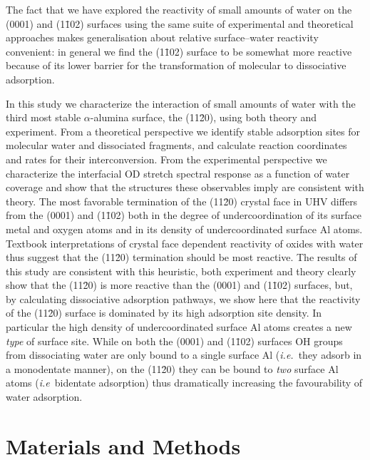 \documentclass[twoside,twocolumn,9pt]{article}
\begin{document}
The fact that we have explored the reactivity of small amounts of water on the (0001) and (1\=102) surfaces using the same suite of experimental and theoretical approaches makes generalisation about relative surface--water reactivity convenient: in general we find the (1\=102) surface to be somewhat more reactive because of its lower barrier for the transformation of molecular to dissociative adsorption.

In this study we characterize the interaction of small amounts of water with the third most stable $\alpha$-alumina surface, the (11\=20), using both theory and experiment. From a theoretical perspective we identify stable adsorption sites for molecular water and dissociated fragments, and calculate reaction coordinates and rates for their interconversion. From the experimental perspective we characterize the interfacial OD stretch spectral response as a function of water coverage and show that the structures these observables imply are consistent with theory. The most favorable termination of the (11\=20) crystal face in UHV differs from the (0001) and (1\=102) both in the degree of undercoordination of its surface metal and oxygen atoms and in its density of undercoordinated surface Al atoms. Textbook interpretations of crystal face dependent reactivity of oxides with water thus suggest that the (11\=20) termination should be most reactive. The results of this study are consistent with this heuristic, both experiment and theory clearly show that the (11\=20) 
 is more reactive than the (0001) and (1\=102) surfaces, but, by calculating  dissociative adsorption pathways, we show here that the reactivity of the (11\=20) surface is dominated by its high adsorption site density. In particular the high density of undercoordinated surface Al atoms creates a new {\it type} of surface site. While on both the (0001) and (1\=102) surfaces OH groups from dissociating water are only bound to a single surface Al (\textit{i.e.}\ they adsorb in a monodentate manner), on the (11\=20) they can be bound to {\it two} surface Al atoms (\textit{i.e}\ bidentate adsorption) thus dramatically increasing the favourability of water adsorption.  

\section{Materials and Methods}
\label{sec2}
\end{document}
